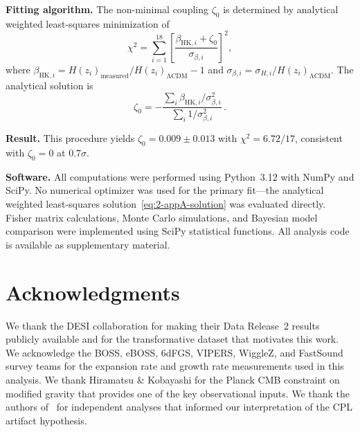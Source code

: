 \textbf{Fitting algorithm.} The non-minimal coupling $\zeta_0$ is determined by analytical weighted least-squares minimization of
\begin{equation}
\chi^2 = \sum_{i=1}^{18} \left[\frac{\beta_{\mathrm{HK},i} + \zeta_0}{\sigma_{\beta,i}}\right]^2,
\label{eq:2-appA-chi2}
\end{equation}
where $\beta_{\mathrm{HK},i} = H(z_i)_\mathrm{measured}/H(z_i)_\mathrm{\Lambda CDM} - 1$ and $\sigma_{\beta,i} = \sigma_{H,i}/H(z_i)_\mathrm{\Lambda CDM}$. The analytical solution is
\begin{equation}
\zeta_0 = -\frac{\sum_i \beta_{\mathrm{HK},i}/\sigma_{\beta,i}^2}{\sum_i 1/\sigma_{\beta,i}^2}\,.
\label{eq:2-appA-solution}
\end{equation}

\textbf{Result.} This procedure yields $\zeta_0 = 0.009 \pm 0.013$ with $\chi^2 = 6.72/17$, consistent with $\zeta_0 = 0$ at $0.7\sigma$.

\textbf{Software.} All computations were performed using Python~3.12 with NumPy and SciPy. No numerical optimizer was used for the primary fit---the analytical weighted least-squares solution~\eqref{eq:2-appA-solution} was evaluated directly. Fisher matrix calculations, Monte Carlo simulations, and Bayesian model comparison were implemented using SciPy statistical functions. All analysis code is available as supplementary material.

\section*{Acknowledgments}
\label{sec:2-ack}

We thank the DESI collaboration for making their Data Release~2 results publicly available and for the transformative dataset that motivates this work. We acknowledge the BOSS, eBOSS, 6dFGS, VIPERS, WiggleZ, and FastSound survey teams for the expansion rate and growth rate measurements used in this analysis. We thank Hiramatsu \& Kobayashi for the Planck CMB constraint on modified gravity that provides one of the key observational inputs. We thank the authors of~\cite{ch2:Nesseris2025,ch2:GomezValent2025,ch2:Lodha2024,ch2:Hasan2025,ch2:Mandal2025,ch2:Andrianomena2025,ch2:Marques2025} for independent analyses that informed our interpretation of the CPL artifact hypothesis.

